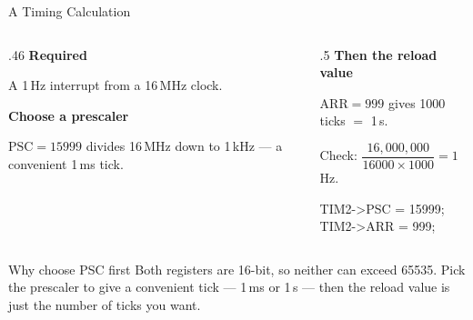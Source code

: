 \documentclass[9pt,aspectratio=169,xcolor=table]{beamer}
\begin{document}
\begin{frame}{A Timing Calculation}
    \begin{columns}[T]
    \begin{column}{.46\textwidth}
        \textbf{Required}

        \vspace{1mm}
        {\small A 1\,Hz interrupt from a 16\,MHz clock.}

        \vspace{3mm}
        \textbf{Choose a prescaler}

        \vspace{1mm}
        {\small $\text{PSC} = 15999$ divides 16\,MHz down to
        \alert{1\,kHz} --- a convenient 1\,ms tick.}
    \end{column}
    \begin{column}{.5\textwidth}
        \textbf{Then the reload value}

        \vspace{1mm}
        {\small $\text{ARR} = 999$ gives 1000 ticks $=$ \alert{1\,s}.}

        \vspace{3mm}
        {\small Check:
        $\dfrac{16{,}000{,}000}{16000 \times 1000} = 1$\,Hz.}

        \vspace{3mm}
        {\ttfamily\scriptsize
        TIM2->PSC = 15999; \\
        TIM2->ARR = 999;}
    \end{column}
    \end{columns}

    \vspace{3mm}
    \begin{block}{Why choose PSC first}
        Both registers are 16-bit, so neither can exceed 65535. Pick the
        prescaler to give a \alert{convenient tick} --- 1\,ms or 1\,\textmu s ---
        then the reload value is just the number of ticks you want.
    \end{block}
\end{frame}
\end{document}
